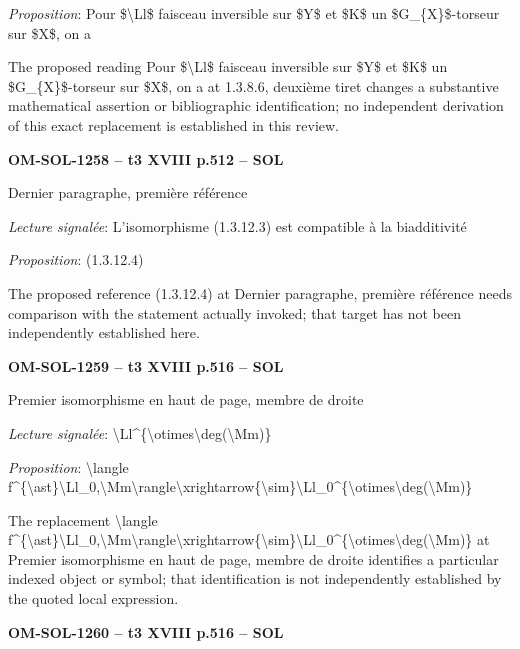 \emph{Proposition}: Pour \$\textbackslash{}Ll\$ faisceau inversible sur \$Y\$ et \$K\$ un \$G\_\{X\}\$-torseur sur \$X\$, on a\par
The proposed reading Pour \$\textbackslash{}Ll\$ faisceau inversible sur \$Y\$ et \$K\$ un \$G\_\{X\}\$-torseur sur \$X\$, on a at 1.3.8.6, deuxième tiret changes a substantive mathematical assertion or bibliographic identification; no independent derivation of this exact replacement is established in this review.\par
\par\noindent\textbf{OM-SOL-1258 -- t3 XVIII p.512 -- SOL}\par
Dernier paragraphe, première référence\par
\emph{Lecture signalée}: L'isomorphisme (1.3.12.3) est compatible à la biadditivité\par
\emph{Proposition}: (1.3.12.4)\par
The proposed reference (1.3.12.4) at Dernier paragraphe, première référence needs comparison with the statement actually invoked; that target has not been independently established here.\par
\par\noindent\textbf{OM-SOL-1259 -- t3 XVIII p.516 -- SOL}\par
Premier isomorphisme en haut de page, membre de droite\par
\emph{Lecture signalée}: \textbackslash{}Ll\textasciicircum{}\{\textbackslash{}otimes\textbackslash{}deg(\textbackslash{}Mm)\}\par
\emph{Proposition}: \textbackslash{}langle f\textasciicircum{}\{\textbackslash{}ast\}\textbackslash{}Ll\_0,\textbackslash{}Mm\textbackslash{}rangle\textbackslash{}xrightarrow\{\textbackslash{}sim\}\textbackslash{}Ll\_0\textasciicircum{}\{\textbackslash{}otimes\textbackslash{}deg(\textbackslash{}Mm)\}\par
The replacement \textbackslash{}langle f\textasciicircum{}\{\textbackslash{}ast\}\textbackslash{}Ll\_0,\textbackslash{}Mm\textbackslash{}rangle\textbackslash{}xrightarrow\{\textbackslash{}sim\}\textbackslash{}Ll\_0\textasciicircum{}\{\textbackslash{}otimes\textbackslash{}deg(\textbackslash{}Mm)\} at Premier isomorphisme en haut de page, membre de droite identifies a particular indexed object or symbol; that identification is not independently established by the quoted local expression.\par
\par\noindent\textbf{OM-SOL-1260 -- t3 XVIII p.516 -- SOL}\par
